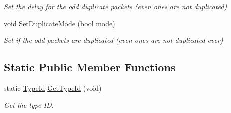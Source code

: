 \begin{DoxyCompactItemize}
\begin{DoxyCompactList}\small\item\em Set the delay for the odd duplicate packets (even ones are not duplicated) \end{DoxyCompactList}\item 
void \hyperlink{classns3_1_1ErrorChannel_ac9d7a41e47d7b4d505f776d289889eaf}{Set\+Duplicate\+Mode} (bool mode)
\begin{DoxyCompactList}\small\item\em Set if the odd packets are duplicated (even ones are not duplicated ever) \end{DoxyCompactList}\end{DoxyCompactItemize}
\subsection*{Static Public Member Functions}
\begin{DoxyCompactItemize}
\item 
static \hyperlink{classns3_1_1TypeId}{Type\+Id} \hyperlink{classns3_1_1ErrorChannel_afa62597dd5f7cd08fbad1dca50abc9ab}{Get\+Type\+Id} (void)
\begin{DoxyCompactList}\small\item\em Get the type ID. \end{DoxyCompactList}\end{DoxyCompactItemize}
